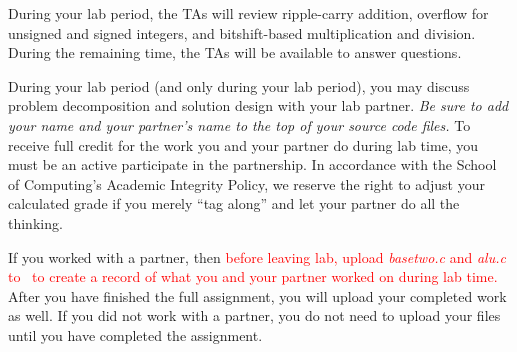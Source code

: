 During your lab period, the TAs will review ripple-carry addition, overflow for unsigned and signed integers, and bitshift-based multiplication and division.
During the remaining time, the TAs will be available to answer questions.

During your lab period (and only during your lab period), you may discuss problem decomposition and solution design with your lab partner.
\textit{Be sure to add your name and your partner's name to the top of your source code files.}
To receive full credit for the work you and your partner do during lab time, you must be an active participate in the partnership.
In accordance with the School of Computing's Academic Integrity Policy, we reserve the right to adjust your calculated grade if you merely ``tag along'' and let your partner do all the thinking.

If you worked with a partner, then \textcolor{red}{before leaving lab, upload \textit{basetwo.c} and \textit{alu.c} to \filesubmission\ to create a record of what you and your partner worked on during lab time.}
After you have finished the full assignment, you will upload your completed work as well.
If you did not work with a partner, you do not need to upload your files until you have completed the assignment.